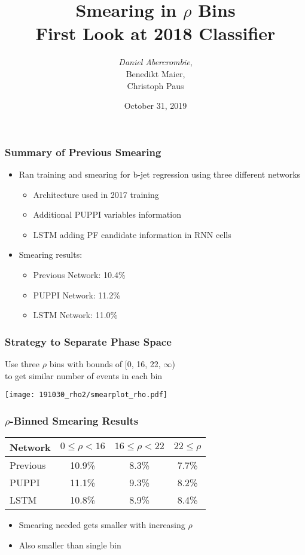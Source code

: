 \documentclass{beamer}
\author[D. Abercrombie]{
  \emph{Daniel Abercrombie}, \\
  Benedikt Maier, \\
  Christoph Paus
}
\title{\bf \sffamily Smearing in $\rho$ Bins \\ First Look at 2018 Classifier}
\date{October 31, 2019}
\begin{document}
\begin{frame}
  \titlepage
\end{frame}

 
\begin{frame}
  \frametitle{Summary of Previous Smearing}

  \begin{itemize}
  \item Ran training and smearing for b-jet regression using three different networks
    \begin{itemize}
    \item Architecture used in 2017 training
    \item Additional PUPPI variables information
    \item LSTM adding PF candidate information in RNN cells
    \end{itemize}
  \item Smearing results:
    \begin{itemize}
    \item Previous Network: 10.4\%
    \item PUPPI Network: 11.2\%
    \item LSTM Network: 11.0\%
    \end{itemize}
  \end{itemize}

\end{frame}


\begin{frame}
  \frametitle{Strategy to Separate Phase Space}

  \vfill
  Use three $\rho$ bins with bounds of [0, 16, 22, $\infty$) \\
  to get similar number of events in each bin
  \vfill

  \centering
  \texttt{[image: 191030\_rho2/smearplot\_rho.pdf]}

\end{frame}


\begin{frame}
  \frametitle{$\rho$-Binned Smearing Results}

  \centering
  \begin{tabular}{|l|c|c|c|}
    \hline
    Network & $0 \leq \rho < 16$ & $16 \leq \rho < 22$ & $22 \leq \rho$ \\
    \hline
    Previous & 10.9\% & 8.3\% & 7.7\% \\
    PUPPI & 11.1\% & 9.3\% & 8.2\% \\
    LSTM & 10.8\% & 8.9\% & 8.4\% \\
    \hline
  \end{tabular}

  \vfill
  \begin{itemize}
  \item Smearing needed gets smaller with increasing $\rho$
  \item Also smaller than single bin
  \end{itemize}
  \vfill

\end{frame}
\end{document}

